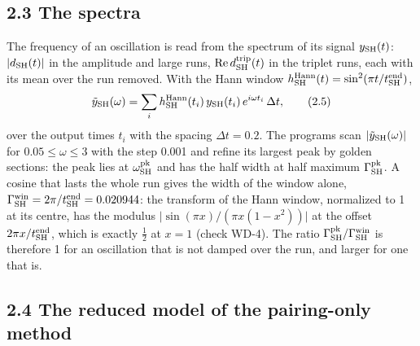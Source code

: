 \documentclass[
  10pt,
]{article}
\begin{document}
\hypertarget{the-spectra}{%
\subsection{2.3 The spectra}\label{the-spectra}}

The frequency of an oscillation is read from the spectrum of its signal
\(y_{\rm SH}(t)\): \(\lvert d_{\rm SH}(t)\rvert\) in the amplitude and
large runs, \(\mathrm{Re}\,d^{\rm trip}_{\rm SH}(t)\) in the triplet
runs, each with its mean over the run removed. With the Hann window
\(h^{\rm Hann}_{\rm SH}(t)=\sin^2(\pi t/t^{\rm end}_{\rm SH})\),
\[\tilde y_{\rm SH}(\omega)=\sum_i h^{\rm Hann}_{\rm SH}(t_i)\,y_{\rm SH}(t_i)\,e^{i\omega t_i}\,\Delta t,\tag{2.5}\]
over the output times \(t_i\) with the spacing \(\Delta t=0.2\). The
programs scan \(\lvert\tilde y_{\rm SH}(\omega)\rvert\) for
\(0.05\le\omega\le3\) with the step 0.001 and refine its largest peak by
golden sections: the peak lies at \(\omega^{\rm pk}_{\rm SH}\) and has
the half width at half maximum \(\Gamma^{\rm pk}_{\rm SH}\). A cosine
that lasts the whole run gives the width of the window alone,
\(\Gamma^{\rm win}_{\rm SH}=2\pi/t^{\rm end}_{\rm SH}=0.020944\): the
transform of the Hann window, normalized to 1 at its centre, has the
modulus \(\lvert\sin(\pi x)/(\pi x(1-x^2))\rvert\) at the offset
\(2\pi x/t^{\rm end}_{\rm SH}\), which is exactly \(\tfrac12\) at
\(x=1\) (check WD-4). The ratio
\(\Gamma^{\rm pk}_{\rm SH}/\Gamma^{\rm win}_{\rm SH}\) is therefore 1
for an oscillation that is not damped over the run, and larger for one
that is.

\hypertarget{the-reduced-model-of-the-pairing-only-method}{%
\subsection{2.4 The reduced model of the pairing-only
method}\label{the-reduced-model-of-the-pairing-only-method}}
\end{document}
